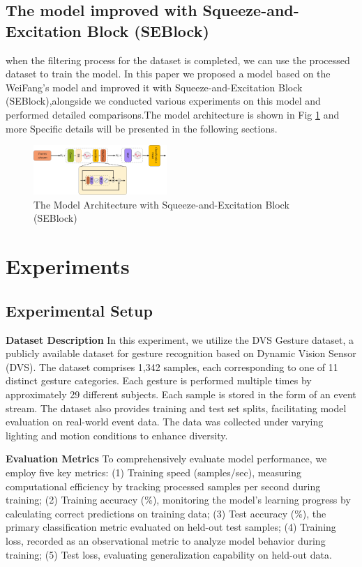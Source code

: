 \documentclass[conference]{IEEEtran}
\begin{document}
\subsection{The model improved with Squeeze-and-Excitation Block (SEBlock)}
when the filtering process for the dataset is completed, we can use the processed dataset to train the model. In this paper we proposed a model based on the WeiFang's model\cite{fang2021} and improved it with Squeeze-and-Excitation Block (SEBlock)\cite{hu2019},alongside we conducted various experiments on this model and performed detailed comparisons.The model architecture is shown in Fig \ref{fig:model} and more Specific details will be presented in the following sections.
\begin{figure}[htbp]
    \centering
    \includegraphics[width=0.45\textwidth]{figure/model.png}
    \caption{The Model Architecture with Squeeze-and-Excitation Block (SEBlock)}
    \label{fig:model}
\end{figure}






\section{Experiments}
\subsection{Experimental Setup}
\textbf{Dataset Description} In this experiment, we utilize the DVS Gesture dataset, a publicly available dataset for gesture recognition based on Dynamic Vision Sensor (DVS). 
The dataset comprises 1,342 samples, each corresponding to one of 11 distinct gesture categories.
Each gesture is performed multiple times by approximately 29 different subjects. 
Each sample is stored in the form of an event stream. 
The dataset also provides training and test set splits, facilitating model evaluation on real-world event data.
The data was collected under varying lighting and motion conditions to enhance diversity.

\textbf{Evaluation Metrics} To comprehensively evaluate model performance, we employ five key metrics: 
(1) Training speed (samples/sec), measuring computational efficiency by tracking processed samples per second during training; 
(2) Training accuracy (\%), monitoring the model's learning progress by calculating correct predictions on training data; 
(3) Test accuracy (\%), the primary classification metric evaluated on held-out test samples;
(4) Training loss, recorded as an observational metric to analyze model behavior during training; 
(5) Test loss, evaluating generalization capability on held-out data. 
\end{document}
